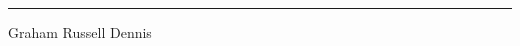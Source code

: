 \documentclass[twoside,onecolumn,11pt,a4paper,draft]{book}
\begin{document}
\hspace{80mm}\rule{40mm}{.15mm}\par   %
\hspace{80mm} Graham Russell Dennis\par





\tableofcontents
\cleardoublepage

\setcounter{page}{1}  %

%

%




%
\appendix
%


\end{document}
